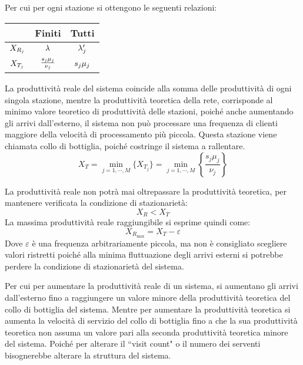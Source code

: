 \documentclass{article}
\numberwithin{equation}{subsection}
\begin{document}
Per cui per ogni stazione si ottengono le seguenti relazioni:
\begin{center}
    \begin{tabular}{c|c|c|}
        & Finiti & Tutti\\
        \hline
        $X_{R_j}\strut$ & $\lambda\strut$ & $\lambda_j'\strut$\\
        \hline
        $X_{T_j}\strut$ & $\frac{s_j\mu_j}{\nu_j}\strut$ & $s_j\mu_j\strut$\\
        \hline
    \end{tabular}
\end{center}
La produttività reale del sistema coincide alla somma delle produttività di ogni singola stazione, mentre la produttività teoretica della rete, corrisponde al minimo valore 
teoretico di produttività delle stazioni, poiché anche aumentando gli arrivi dall'esterno, il sistema non può processare una frequenza di clienti maggiore della 
velocità di processamento più piccola. Questa stazione viene chiamata collo di bottiglia, poiché costringe il sistema a rallentare. 
\begin{equation}
    X_T=\min_{j=1,\cdots,M}\{X_{T_j}\}=\min_{j=1,\cdots,M}\left\{\displaystyle\frac{s_j\mu_j}{\nu_j}\right\}
\end{equation}

La produttività reale non potrà mai oltrepassare la produttività teoretica, per mantenere verificata la condizione di stazionarietà:
\begin{equation*}
    X_R< X_T
\end{equation*}
La massima produttività reale raggiungibile si esprime quindi come:
\begin{equation}
    X_{R_{\max}}=X_T-\varepsilon
\end{equation}
Dove $\varepsilon$ è una frequenza arbitrariamente piccola, ma non è consigliato scegliere valori ristretti poiché alla minima fluttuazione degli arrivi esterni si potrebbe 
perdere la condizione di stazionarietà del sistema. 

Per cui per aumentare la produttività reale di un sistema, si aumentano gli arrivi dall'esterno fino a raggiungere un valore minore della produttività teoretica del collo di 
bottiglia del sistema. Mentre per aumentare la produttività teoretica si aumenta la velocità di servizio del collo di bottiglia fino a che la sua produttività teoretica non assuma 
un valore pari alla seconda produttività teoretica minore del sistema. Poiché per alterare il ``visit count" o il numero dei serventi bisognerebbe alterare la struttura del 
sistema. 
\end{document}
